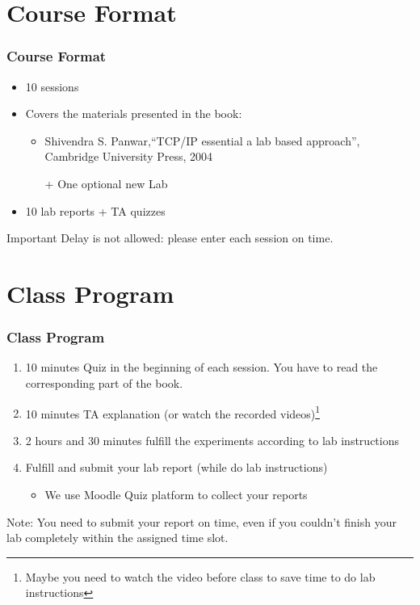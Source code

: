 \documentclass[aspectratio=169,15pt]{beamer}
\begin{document}
\section{Course Format}
\begin{frame}
    \frametitle{Course Format}

    \begin{itemize}
        \item 10 sessions
        \item Covers the materials presented in the book:
        \begin{itemize}
            \item Shivendra S. Panwar,“TCP/IP essential a lab based approach”, Cambridge University Press, 2004
            \item[+] One optional new Lab
        \end{itemize}
        \item 10 lab reports + TA quizzes
    \end{itemize}
    \begin{alertblock}{Important}
        Delay is not allowed: please enter each session on time.
    \end{alertblock}
    
\end{frame}

\section{Class Program}
\begin{frame}
    \frametitle{Class Program}
    
    \begin{enumerate}
        \item \alert{10 minutes} Quiz in the beginning of each session. You have to read the corresponding part of the book.
        \item \alert{10 minutes} TA explanation (or watch the recorded videos)\footnote{Maybe you need to watch the video before class to save time to do lab instructions}
        \item \alert{2 hours and 30 minutes} fulfill the experiments according to lab instructions
        \item Fulfill and submit your lab report (while do lab instructions)
        \begin{itemize}
            \item We use Moodle Quiz platform to collect your reports
        \end{itemize}
    \end{enumerate}
    \begin{alertblock}{Note:}
        You need to submit your report on time, even if you couldn’t finish your lab completely within the assigned time slot.
    \end{alertblock}

\end{frame}
\end{document}
